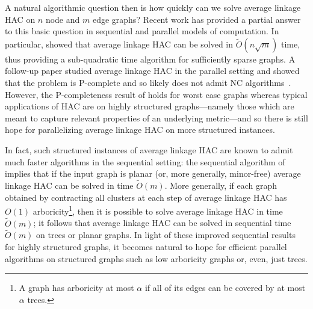 \documentclass[11pt]{article}
\newcommand{\NC}{\textsc{NC}\xspace}
\newcommand{\PTime}{\textsc{P}\xspace}
\begin{document}
A natural algorithmic question then is how quickly can we solve average linkage HAC on $n$ node and $m$ edge graphs? 
Recent work has provided a partial answer to this basic question in sequential and parallel models of computation.
In particular, \cite{dhulipala2021hierarchical} showed that average linkage HAC can be solved in $\tilde{O}(n\sqrt{m})$ time, thus providing a sub-quadratic time algorithm for sufficiently sparse graphs.
A follow-up paper studied average linkage HAC in the parallel setting and showed that the problem is \PTime-complete and so likely does not admit \NC algorithms~\cite{dhulipala2022hierarchical}. 
However, the \PTime-completeness result of \cite{dhulipala2022hierarchical} holds for worst case graphs whereas typical applications of HAC are on highly structured graphs---namely those which are meant to capture relevant properties of an underlying metric---and so there is still hope for parallelizing average linkage HAC on more structured instances. 

In fact, such structured instances of average linkage HAC are known to admit much faster algorithms in the sequential setting: the sequential algorithm of \cite{dhulipala2021hierarchical} implies that if the input graph is planar (or, more generally, minor-free) average linkage HAC can be solved in time $\tilde{O}(m)$. 
More generally, if each graph obtained by contracting all clusters at each step of average linkage HAC has $O(1)$ arboricity\footnote{A graph has arboricity at most $\alpha$ if all of its edges can be covered by at most $\alpha$ trees.}, then it is possible to solve average linkage HAC in time $\tilde{O}(m)$; it follows that average linkage  HAC can be solved in sequential time $\tilde{O}(m)$ on trees or planar graphs.
In light of these improved sequential results for highly structured graphs, it becomes natural to hope for efficient parallel algorithms on structured graphs such as low arboricity graphs or, even, just trees.







\end{document}
